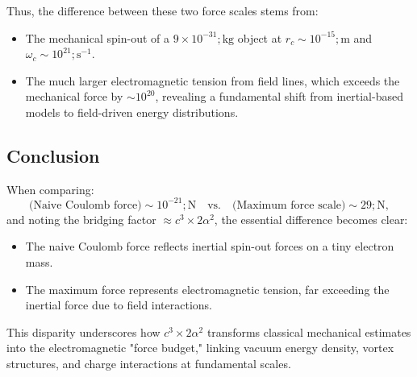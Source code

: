 Thus, the difference between these two force scales stems from:
\begin{itemize}
\item The mechanical spin-out of a $9 \times 10^{-31} ; \mathrm{kg}$ object at $r_c \sim 10^{-15} ; \mathrm{m}$ and $\omega_c \sim 10^{21} ; \mathrm{s^{-1}}$.
\item The much larger electromagnetic tension from field lines, which exceeds the mechanical force by $\sim 10^{20}$, revealing a fundamental shift from inertial-based models to field-driven energy distributions.
\end{itemize}


\subsection*{Conclusion}


When comparing:
\begin{equation}
\text{(Naive Coulomb force)} \sim 10^{-21} ; \mathrm{N} \quad \text{vs.} \quad \text{(Maximum force scale)} \sim 29 ; \mathrm{N},
\end{equation}
and noting the bridging factor $\approx c^3 \times 2 \alpha^2$, the essential difference becomes clear:
\begin{itemize}
\item The naive Coulomb force reflects inertial spin-out forces on a tiny electron mass.
\item The maximum force represents electromagnetic tension, far exceeding the inertial force due to field interactions.
\end{itemize}
This disparity underscores how $c^3 \times 2 \alpha^2$ transforms classical mechanical estimates into the electromagnetic "force budget," linking vacuum energy density, vortex structures, and charge interactions at fundamental scales.

